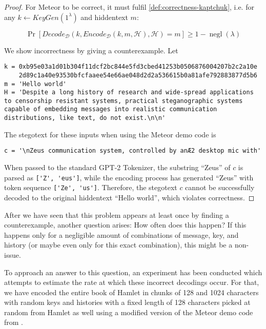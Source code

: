 \begin{proof}
For Meteor to be correct, it must fulfil \autoref{def:correctness-kaptchuk}, i.e. for any $k \leftarrow KeyGen(1^\lambda)$ and hiddentext $m$:

$$\mathop{Pr}[Decode_{\mathcal{D}}(k, Encode_{\mathcal{D}}(k, m, \mathcal{H}), \mathcal{H}) = m] \geq 1 - \mathop{negl}(\lambda)$$

We show incorrectness by giving a counterexample. 
Let

\begin{lstlisting}[breaklines]
k = 0xb95e03a1d01b304f11dcf2bc844e5fd3cbed41253b0506876004207b2c2a10e
    2d89c1a40e93530bfcfaaee54e66ae048d2d2a536615b0a81afe792883877d5b6
m = 'Hello world'
H = 'Despite a long history of research and wide-spread applications to censorship resistant systems, practical steganographic systems capable of embedding messages into realistic communication distributions, like text, do not exist.\n\n'
\end{lstlisting}

The stegotext for these inputs when using the Meteor demo code is

\begin{lstlisting}
c = '\nZeus communication system, controlled by anÆ2 desktop mic with'
\end{lstlisting}

When passed to the standard GPT-2 Tokenizer, the substring ``Zeus'' of $c$ is parsed as \lstinline{['Z', 'eus']}, while the encoding process has generated ``Zeus'' with token sequence \lstinline{['Ze', 'us']}.
Therefore, the stegotext $c$ cannot be successfully decoded to the original hiddentext ``Hello world'', which violates correctness.
\end{proof}

After we have seen that this problem appears at least once by finding a counterexample, another question arises:
How often does this happen?
If this happens only for a negligible amount of combinations of message, key, and history (or maybe even only for this exact combination), this might be a non-issue.

To approach an answer to this question, an experiment has been conducted which attempts to estimate the rate at which these incorrect decodings occur.
For that, we have encoded the entire book of Hamlet in chunks of 128 and 1024 characters with random keys and histories with a fixed length of 128 characters picked at random from Hamlet as well using a modified version of the Meteor demo code from \cite{MeteorDemo2021}.

